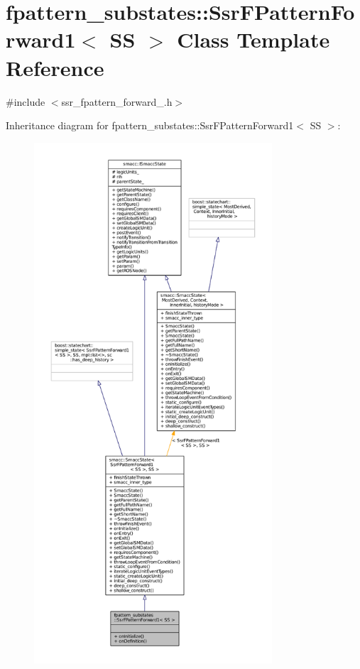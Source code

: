 \hypertarget{structfpattern__substates_1_1SsrFPatternForward1}{}\section{fpattern\+\_\+substates\+:\+:Ssr\+F\+Pattern\+Forward1$<$ SS $>$ Class Template Reference}
\label{structfpattern__substates_1_1SsrFPatternForward1}


{\ttfamily \#include $<$ssr\+\_\+fpattern\+\_\+forward\+\_.\+h$>$}



Inheritance diagram for fpattern\+\_\+substates\+:\+:Ssr\+F\+Pattern\+Forward1$<$ SS $>$\+:
\nopagebreak
\begin{figure}[H]
\begin{center}
\leavevmode
\includegraphics[height=550pt]{structfpattern__substates_1_1SsrFPatternForward1__inherit__graph}
\end{center}
\end{figure}


